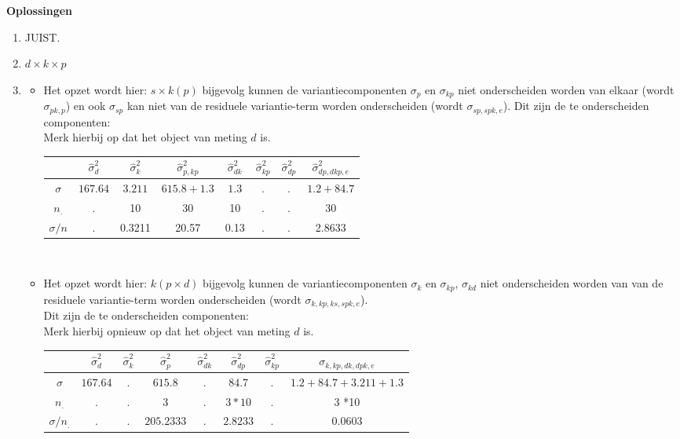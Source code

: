 \OPLOSSING
{
\textbf{Oplossingen}
\begin{enumerate}
\item JUIST.
\item $d \times k \times p$

\item
\begin{itemize}
	\item Het opzet wordt hier: $s\times k\left(p\right)$ bijgevolg kunnen de variantiecomponenten $\sigma_p$ en $\sigma_{kp}$ niet onderscheiden worden van elkaar (wordt $\sigma_{pk,p}$) en ook $\sigma_{sp}$ kan niet van de residuele variantie-term worden onderscheiden (wordt $\sigma_{sp, spk,e}$). Dit zijn de te onderscheiden componenten:\\ Merk hierbij op dat het object van meting $d$ is. \\
	\begin{tabular}{|c|c|c|c|c|c|c|c|} \hline
	 & $ \hat{\sigma}^2_{d}$ & $ \hat{\sigma}^2_{k} $& $ \hat{\sigma}^2_{p,kp} $ & $ \hat{\sigma}^2_{dk}$ & $\hat{\sigma}^2_{kp} $ & $ \hat{\sigma}^2_{dp} $& $ \hat{\sigma}^2_{dp, dkp, e} $ \\ \hline
	$\sigma$  			& $ 167.64 $ 			& $ 3.211 $ 			& $615.8+1.3  $ 			& $ 1.3 $				 & $. $	& $ . $& $ 1.2 + 84.7  $ \\
	$n_.$				& .						& 10					& 30				 		& 10			  		 & $. $	& $ . $&  30 \\ \hline
	$\sigma / n$ 		& .						& 0.3211				& 20.57				 		& 0.13			  	 & $. $	& $ . $&  2.8633 \\ \hline
	\end{tabular} \\
	
	
	\item Het opzet wordt hier: $k\left(p\times d\right)$ bijgevolg kunnen de variantiecomponenten $\sigma_k$ en $\sigma_{kp}$, $\sigma_{kd}$ niet onderscheiden worden van  van de residuele variantie-term worden onderscheiden (wordt $\sigma_{k, kp, ks, spk, e}$).\\Dit zijn de te onderscheiden componenten:\\ Merk hierbij opnieuw op dat het object van meting $d$ is. \\
	\begin{tabular}{|c|c|c|c|c|c|c|c|} \hline
	 & $ \hat{\sigma}^2_{d} $ & $ \hat{\sigma}^2_{k} $& $ \hat{\sigma}^2_{p} $ & $ \hat{\sigma}^2_{dk} $ & $ \hat{\sigma}^2_{dp} $ & $ \hat{\sigma}^2_{kp} $ &
	 $\sigma_{k, kp, dk, dpk, e}$ \\ \hline
	$\sigma$  			& $ 167.64 $ 			& $. $ 			& $615.8 $ 	  & $.$				 & $84.7 $	& $ . $& $ 1.2 + 84.7 +  3.211 +1.3$ \\
	$n_.$ 				& . 					& $.$			& 3			  & $.$		  		 & $3*10$	& $ . $&  3 *10 \\ \hline
	$\sigma / n_.$     & .				& $. $			& $205.2333$  & $.$			  	 & $2.8233$	& $ . $&  0.0603 \\ \hline
	\end{tabular} \\
	
\end{itemize}


\end{enumerate}}

